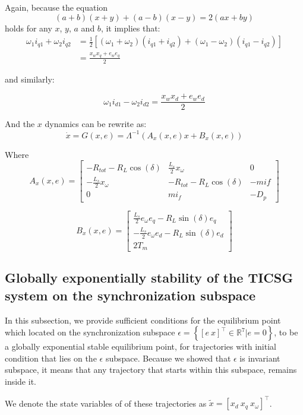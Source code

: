 \documentclass[letterpaper, 10 pt, conference]{ieeeconf}  %
\begin{document}
Again, because the  equation  
$$
(a+b)(x+y)+(a-b)(x-y)=2(ax+by)
$$
holds for any $x$, $y$, $a$ and $b$, it implies that:
$$
\begin{aligned}
\omega_{1}i_{q1}+\omega_{2}i_{q2} &=\frac{1}{2}\left[(\omega_{1}+\omega_{2})(i_{q1}+i_{q2})+(\omega_{1}-\omega_{2})(i_{q1}-i_{q2})\right]\\ & =\frac{x_{w}x_{q}+e_{w}e_{q}}{2}
\end{aligned}
$$

and similarly:

$$
\omega_{1}i_{d1}-\omega_{2}i_{d2}=\frac{x_{w}x_{d}+e_{w}e_{d}}{2}
$$ 

And the $x$ dynamics can be rewrite as:
$$ \dot{x}=G \left( x,e\right)= \Lambda^{-1}\left(A_x \left(x,e \right) x + B_x \left( x,e\right) \right) $$

Where
$$
A_x \left(x,e \right)=\left[\begin{array}{ccc}
-R_{tot}-R_{L}\cos(\delta) & \frac{L_{s}}{2}x_{\omega} & 0\\
-\frac{L_{s}}{2}x_{\omega} & -R_{tot}-R_{L}\cos(\delta) & -mif\\
0 & mi_{f} & -D_{p}
\end{array}\right]
$$

$$
B_x \left(x,e \right)=\left[\begin{array}{c}
\frac{L_{s}}{2}e_{\omega}e_{q}-R_{L}\sin(\delta)e_{q}\\
-\frac{L_{s}}{2}e_{\omega}e_{d}-R_{L}\sin(\delta)e_{d}\\
2T_{m}
\end{array}\right]
$$

\subsection{Globally exponentially stability of the TICSG system on the synchronization subspace }

In this subsection, we provide sufficient conditions for the equilibrium
point which located on the synchronization subspace $\epsilon=\left\{ \left[ e\ x \right]^\top \in\mathbb{R}^{7}|e=0\right\} $,  to be a globally exponential stable equilibrium point, for trajectories with initial condition that lies on the $\epsilon$ subspace.  Because we showed that  $\epsilon$ is invariant subspace, it means that any trajectory that starts within this subspace, remains inside it.

We denote the state variables of of these trajectories as $\tilde{x} = \left[x_d \ x_q\ x_\omega \right]^\top$. 
\end{document}
